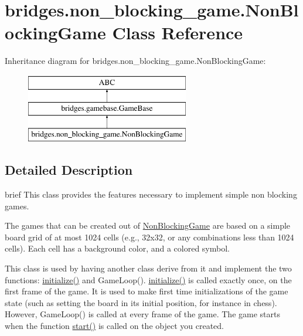 \hypertarget{classbridges_1_1non__blocking__game_1_1_non_blocking_game}{}\section{bridges.\+non\+\_\+blocking\+\_\+game.\+Non\+Blocking\+Game Class Reference}
\label{classbridges_1_1non__blocking__game_1_1_non_blocking_game}
Inheritance diagram for bridges.\+non\+\_\+blocking\+\_\+game.\+Non\+Blocking\+Game\+:\begin{figure}[H]
\begin{center}
\leavevmode
\includegraphics[height=3.000000cm]{classbridges_1_1non__blocking__game_1_1_non_blocking_game}
\end{center}
\end{figure}


\subsection{Detailed Description}
brief This class provides the features necessary to implement simple non blocking games. 

The games that can be created out of \mbox{\hyperlink{classbridges_1_1non__blocking__game_1_1_non_blocking_game}{Non\+Blocking\+Game}} are based on a simple board grid of at most 1024 cells (e.\+g., 32x32, or any combinations less than 1024 cells). Each cell has a background color, and a colored symbol.

This class is used by having another class derive from it and implement the two functions\+: \mbox{\hyperlink{classbridges_1_1gamebase_1_1_game_base_a336629d190f1601f1211ca57e4d5427d}{initialize()}} and Game\+Loop(). \mbox{\hyperlink{classbridges_1_1gamebase_1_1_game_base_a336629d190f1601f1211ca57e4d5427d}{initialize()}} is called exactly once, on the first frame of the game. It is used to make first time initializations of the game state (such as setting the board in its initial position, for instance in chess). However, Game\+Loop() is called at every frame of the game. The game starts when the function \mbox{\hyperlink{classbridges_1_1non__blocking__game_1_1_non_blocking_game_ad6e23c265e1b710114459f0b666d25cb}{start()}} is called on the object you created.

